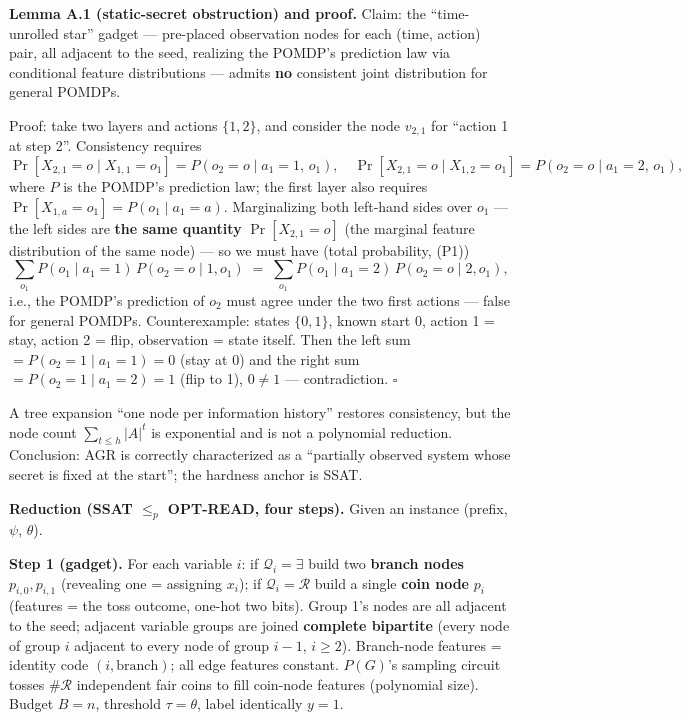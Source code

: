 \documentclass{article}
\providecommand{\qed}{\hfill$\square$}
\begin{document}
\textbf{Lemma A.1 (static-secret obstruction) and proof.} Claim: the ``time-unrolled star'' gadget --- pre-placed observation nodes for each (time, action) pair, all adjacent to the seed, realizing the POMDP's prediction law via conditional feature distributions --- admits \textbf{no} consistent joint distribution for general POMDPs.

Proof: take two layers and actions $\{1,2\}$, and consider the node $v_{2,1}$ for ``action 1 at step 2''. Consistency requires
\[
\Pr[X_{2,1}{=}o\mid X_{1,1}{=}o_1]=P(o_2{=}o\mid a_1{=}1,\,o_1),\quad \Pr[X_{2,1}{=}o\mid X_{1,2}{=}o_1]=P(o_2{=}o\mid a_1{=}2,\,o_1),
\]
where $P$ is the POMDP's prediction law; the first layer also requires $\Pr[X_{1,a}{=}o_1]=P(o_1\mid a_1{=}a)$. Marginalizing both left-hand sides over $o_1$ --- the left sides are \textbf{the same quantity} $\Pr[X_{2,1}{=}o]$ (the marginal feature distribution of the same node) --- so we must have (total probability, (P1))
\[
\sum_{o_1}P(o_1\mid a_1{=}1)\,P(o_2{=}o\mid 1,o_1)\;=\;\sum_{o_1}P(o_1\mid a_1{=}2)\,P(o_2{=}o\mid 2,o_1),
\]
i.e., the POMDP's prediction of $o_2$ must agree under the two first actions --- false for general POMDPs. Counterexample: states $\{0,1\}$, known start 0, action 1 = stay, action 2 = flip, observation = state itself. Then the left sum $=P(o_2{=}1\mid a_1{=}1)=0$ (stay at 0) and the right sum $=P(o_2{=}1\mid a_1{=}2)=1$ (flip to 1), $0\ne1$ --- contradiction. \qed{}

A tree expansion ``one node per information history'' restores consistency, but the node count $\sum_{t\le h}|A|^t$ is exponential and is not a polynomial reduction. Conclusion: AGR is correctly characterized as a ``partially observed system whose secret is fixed at the start''; the hardness anchor is SSAT.

\textbf{Reduction (SSAT $\le_p$ OPT-READ, four steps).} Given an instance (prefix, $\psi$, $\theta$).

\textbf{Step 1 (gadget).} For each variable $i$: if $\mathcal Q_i=\exists$ build two \textbf{branch nodes} $p_{i,0},p_{i,1}$ (revealing one = assigning $x_i$); if $\mathcal Q_i=\mathcal R$ build a single \textbf{coin node} $p_i$ (features = the toss outcome, one-hot two bits). Group 1's nodes are all adjacent to the seed; adjacent variable groups are joined \textbf{complete bipartite} (every node of group $i$ adjacent to every node of group $i-1$, $i\ge2$). Branch-node features = identity code $(i,\text{branch})$; all edge features constant. $P(G)$'s sampling circuit tosses $\#\mathcal R$ independent fair coins to fill coin-node features (polynomial size). Budget $B=n$, threshold $\tau=\theta$, label identically $y=1$.
\end{document}
